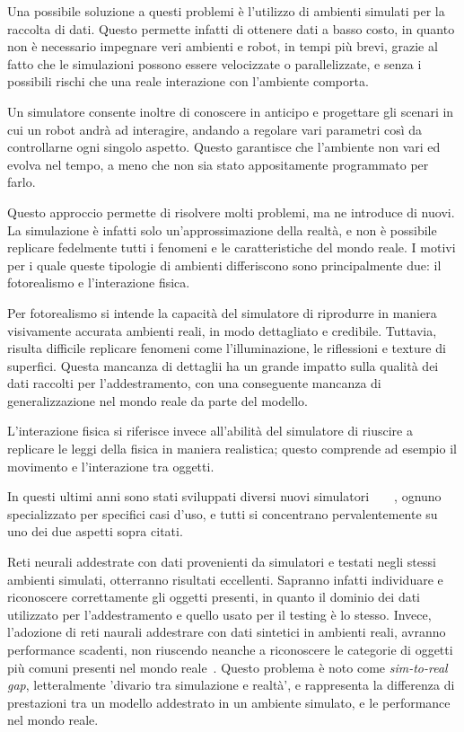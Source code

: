\documentclass[12pt]{report}
\begin{document}
Una possibile soluzione a questi problemi è l'utilizzo di ambienti simulati per la raccolta di dati. Questo permette infatti di ottenere dati a basso costo, in quanto non è necessario impegnare veri ambienti e robot, in tempi più brevi, grazie al fatto che le simulazioni possono essere velocizzate o parallelizzate, e senza i possibili rischi che una reale interazione con l'ambiente comporta.

Un simulatore consente inoltre di conoscere in anticipo e progettare gli scenari in cui un robot andrà ad interagire, andando a regolare vari parametri così da controllarne ogni singolo aspetto. Questo garantisce che l'ambiente non vari ed evolva nel tempo, a meno che non sia stato appositamente programmato per farlo.

Questo approccio permette di risolvere molti problemi, ma ne introduce di nuovi. La simulazione è infatti solo un'approssimazione della realtà, e non è possibile replicare fedelmente tutti i fenomeni e le caratteristiche del mondo reale. I motivi per i quale queste tipologie di ambienti differiscono sono principalmente due: il fotorealismo e l'interazione fisica.

Per fotorealismo si intende la capacità del simulatore di riprodurre in maniera visivamente accurata ambienti reali, in modo dettagliato e credibile. Tuttavia, risulta difficile replicare fenomeni come l'illuminazione, le riflessioni e texture di superfici. Questa mancanza di dettaglii ha un grande impatto sulla qualità dei dati raccolti per l'addestramento, con una conseguente mancanza di generalizzazione nel mondo reale da parte del modello.

L'interazione fisica si riferisce invece all'abilità del simulatore di riuscire a replicare le leggi della fisica in maniera realistica; questo comprende ad esempio il movimento e l'interazione tra oggetti.

In questi ultimi anni sono stati sviluppati diversi nuovi simulatori~\cite{kolve2022ai2thorinteractive3denvironment}~\cite{NEURIPS2021_021bbc7e}~\cite{urakami2022doorgymscalabledooropening}~\cite{1389727}, ognuno specializzato per specifici casi d'uso, e tutti si concentrano pervalentemente su uno dei due aspetti sopra citati.

Reti neurali addestrate con dati provenienti da simulatori e testati negli stessi ambienti simulati, otterranno risultati eccellenti. Sapranno infatti individuare e riconoscere correttamente gli oggetti presenti, in quanto il dominio dei dati utilizzato per l'addestramento e quello usato per il testing è lo stesso. Invece, l'adozione di reti naurali addestrare con dati sintetici in ambienti reali, avranno performance scadenti, non riuscendo neanche a riconoscere le categorie di oggetti più comuni presenti nel mondo reale~\cite{8793591}. Questo problema è noto come \textit{sim-to-real gap}, letteralmente 'divario tra simulazione e realtà', e rappresenta la differenza di prestazioni tra un modello addestrato in un ambiente simulato, e le performance nel mondo reale.
\end{document}

